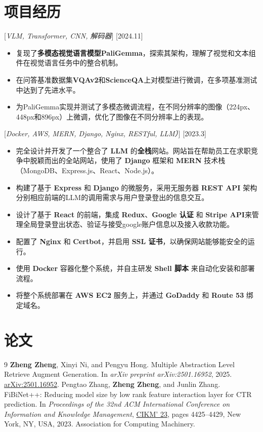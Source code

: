 \documentclass{resume}
\begin{document}
\section{项目经历}
[\emph{VLM, Transformer, CNN, 解码器}]
[2024.11]
\begin{itemize}
  \item 复现了\textbf{多模态视觉语言模型PaliGemma}，探索其架构，理解了视觉和文本组件在视觉语言任务中的整合机制。
  \item 在问答基准数据集\textbf{VQAv2}和\textbf{ScienceQA}上对模型进行微调，在多项基准测试中达到了先进水平。
  \item 为PaliGemma实现并测试了多模态微调流程，在不同分辨率的图像（224px、448px和896px）上微调，优化了图像在不同分辨率上的表现。
\end{itemize}
[\emph{Docker, AWS, MERN, Django, Nginx, RESTful, LLM）}]
[2023.3]
\begin{itemize}
  \item 完全设计并开发了一个整合了 \textbf{LLM} 的\textbf{全栈}网站。网站旨在帮助员工在求职竞争中脱颖而出的全站网站，使用了 \textbf{Django} 框架和 \textbf{MERN} 技术栈（MongoDB、Express.js、React、Node.js）。
  \item 构建了基于 \textbf{Express} 和 \textbf{Django} 的微服务，采用无服务器 \textbf{REST API} 架构分别相应前端的LLM的调用需求与用户登录登出的信息交互。
  \item 设计了基于 \textbf{React} 的前端，集成 \textbf{Redux}、\textbf{Google 认证} 和 \textbf{Stripe API}来管理全局登录登出状态、验证与接受google账户信息以及接入收款功能。
  \item 配置了 \textbf{Nginx} 和 \textbf{Certbot}，并启用 \textbf{SSL 证书}，以确保网站能够能安全的运行。
  \item 使用 \textbf{Docker} 容器化整个系统，并自主研发 \textbf{Shell 脚本} 来自动化安装和部署流程。
  \item 将整个系统部署在 \textbf{AWS EC2} 服务上，并通过 \textbf{GoDaddy} 和 \textbf{Route 53} 绑定域名。
\end{itemize}
\section{论文}
\begingroup
\renewcommand{\section}[2]{}%
\begin{thebibliography}{9}
\textbf{Zheng Zheng}, Xinyi Ni, and Pengyu Hong. Multiple Abstraction Level Retrieve Augment Generation. In \textit{arXiv preprint arXiv:2501.16952}, 2025. \href{https://arxiv.org/abs/2501.16952}{\color{blue}arXiv:2501.16952}.
Pengtao Zhang, \textbf{Zheng Zheng}, and Junlin Zhang. FiBiNet++: Reducing model size by low rank feature interaction layer for CTR prediction. In \textit{Proceedings of the 32nd ACM International Conference on Information and Knowledge Management}, \href{https://dl.acm.org/doi/10.1145/3583780.3615242}{\color{blue}CIKM' 23}, pages 4425–4429, New York, NY, USA, 2023. Association for Computing Machinery.
\end{thebibliography}
\endgroup
\end{document}
